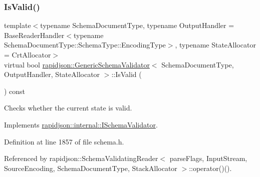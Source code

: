 \subsubsection{\texorpdfstring{IsValid()}{IsValid()}}
{\footnotesize\ttfamily template$<$typename Schema\+Document\+Type, typename Output\+Handler = Base\+Reader\+Handler$<$typename Schema\+Document\+Type\+::\+Schema\+Type\+::\+Encoding\+Type$>$, typename State\+Allocator = Crt\+Allocator$>$ \\
virtual bool \mbox{\hyperlink{classrapidjson_1_1_generic_schema_validator}{rapidjson\+::\+Generic\+Schema\+Validator}}$<$ Schema\+Document\+Type, Output\+Handler, State\+Allocator $>$\+::Is\+Valid (\begin{DoxyParamCaption}{ }\end{DoxyParamCaption}) const\hspace{0.3cm}{\ttfamily [virtual]}}



Checks whether the current state is valid. 



Implements \mbox{\hyperlink{classrapidjson_1_1internal_1_1_i_schema_validator_a5746528d0c29832b748855896ef2bcc8}{rapidjson\+::internal\+::\+I\+Schema\+Validator}}.



Definition at line 1857 of file schema.\+h.


\begin{DoxyCode}{0}

\end{DoxyCode}


Referenced by rapidjson\+::\+Schema\+Validating\+Reader$<$ parse\+Flags, Input\+Stream, Source\+Encoding, Schema\+Document\+Type, Stack\+Allocator $>$\+::operator()().

\mbox{\label{classrapidjson_1_1_generic_schema_validator_af2ad6b4fb9837b90643da7cdd62e413b}} 
